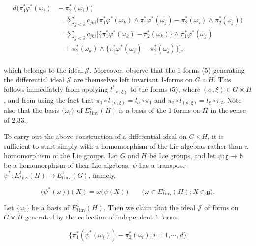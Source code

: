 \begin{equation}
\tag{6}\label{eq:3.15:6}
\begin{aligned}{d\big(\pi_{1}^{*}\varphi^{*}(\omega_{i})}&{{}-\pi_{2}^{*}(\omega_{i})\big)}\\ {}&{{}=\sum_{j<k}c_{j k i}\big(\pi_{1}^{*}\varphi^{*}(\omega_{k})\wedge\pi_{1}^{*}\varphi^{*}(\omega_{j})-\pi_{2}^{*}(\omega_{k})\wedge\pi_{2}^{*}(\omega_{j})\big)}\\ {}&{{}=\sum_{j<k}c_{j k i}[\{\pi_{1}^{*}\varphi^{*}(\omega_{k})-\pi_{2}^{*}(\omega_{k})\}\wedge\pi_{1}^{*}\varphi^{*}(\omega_{j})}\\ {}&{{}\quad+\pi_{2}^{*}(\omega_{k})\wedge\{\pi_{1}^{*}\varphi^{*}(\omega_{j})-\pi_{2}^{*}(\omega_{j})\}],}\\ \end{aligned}
\end{equation}

which belongs to the ideal $\mathcal{J}$. Moreover, observe that the 1-forms (5) generating the differential ideal $\mathcal{J}$ are themselves left invariant 1-forms on $G \times H$. This follows immediately from applying $l_{(\sigma,\xi)}^{*}$ to the forms (5), where $(\sigma,\xi)\in G\times H$, and from using the fact that $\pi_1\circ l_{(\sigma,\xi)}=l_\sigma\circ\pi_1$ and $\pi_2\circ l_{(\sigma,\xi)}=l_\xi\circ\pi_2$. Note also that the basis $\{\omega_i\}$ of $E^1_{l\,\mathrm{inv}}(H)$ is a basis of the 1-forms on $H$ in the sense of 2.33.

To carry out the above construction of a differential ideal on $G \times H$, it is sufficient to start simply with a homomorphism of the Lie algebras rather than a homomorphism of the Lie groups. Let $G$ and $H$ be Lie groups, and let $\psi\colon\mathfrak{g}\to\mathfrak{h}$ be a homomorphism of their Lie algebras. $\psi$ has a transpose $\psi^*: E_{l\,\mathrm{inv}}^{1}(H) \to E_{l\,\mathrm{inv}}^{1}(G)$, namely,

\begin{equation}
\tag{7}\label{eq:3.15:7}
\big(\psi^{*}(\omega)\big)(X)=\omega\big(\psi(X)\big)\qquad\big(\omega\in E_{l\,\mathrm{inv}}^{1}(H);X\in\mathfrak{g}\big).
\end{equation}

Let $\{\omega_i\}$ be a basis of $E^{1}_{l\,\mathrm{inv}}(H)$. Then we claim that the ideal $\mathcal{J}$ of forms on $G \times H$ generated by the collection of independent 1-forms

\begin{equation}
\tag{8}\label{eq:3.15:8}
\{\pi_{1}^{*}(\psi^{*}(\omega_{i}))-\pi_{2}^{*}(\omega_{i})\colon i=1,\cdots,d\}
\end{equation}

